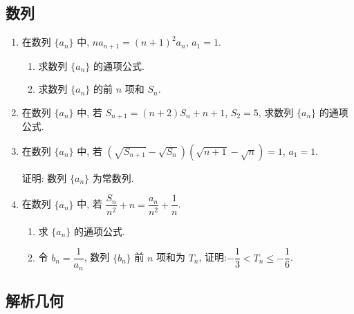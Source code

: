\documentclass[12pt, a4paper, oneside]{ctexart}
\begin{document}
\subsection{数列}

\begin{enumerate}[leftmargin=*]
    \item 在数列 $\{a_n\}$ 中, $n a_{n+1} = \left( n + 1 \right)^2 a_n$, $a_1 = 1$.
          \begin{enumerate}
              \item 求数列 $\{a_n\}$ 的通项公式.
              \item 求数列 $\{a_n\}$ 的前 $n$ 项和 $S_n$.
          \end{enumerate}
          \newpage
    \item 在数列 $\{a_n\}$ 中, 若 $S_{n+1} = (n+2)S_n + n+1$, $S_2 = 5$, 求数列 $\{a_n\}$ 的通项公式.
          \vspace*{2\baselineskip}
    \item 在数列 $\{a_n\}$ 中, 若 $\left( \sqrt{S_{n+1}} - \sqrt{S_n} \right) \left( \sqrt{n+1} - \sqrt{n} \right) = 1$, $a_1=1$.
    
    证明: 数列 $\{a_n\}$ 为常数列.
          \vspace*{2\baselineskip}
    \item 在数列 $\{a_n\}$ 中, 若 $\dfrac{S_n}{n^2} + n = \dfrac{a_n}{n^2} + \dfrac{1}{n}$.
          \begin{enumerate}
              \item 求 $\{a_n\}$ 的通项公式.
              \item 令 $b_n = \dfrac{1}{a_n}$, 数列 $\{b_n\}$ 前 $n$ 项和为 $T_n$, 证明:$-\dfrac{1}{3} < T_n \leqslant -\dfrac{1}{6}$.
          \end{enumerate}
\end{enumerate}

\subsection{解析几何}
\end{document}
